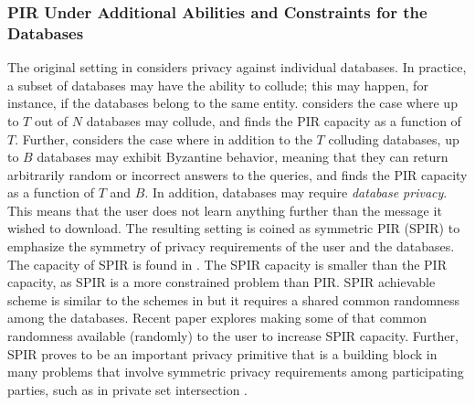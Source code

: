 \subsubsection{PIR Under Additional Abilities and Constraints for the Databases}
The original setting in \cite{sun2017PIRcapacity} considers privacy against individual databases. In practice, a subset of databases may have the ability to collude; this may happen, for instance, if the databases belong to the same entity. \cite{Sun_Jafar_TPIR} considers the case where up to $T$ out of $N$ databases may collude, and finds the PIR capacity as a function of $T$. Further, \cite{BPIRjournal} considers the case where in addition to the $T$ colluding databases, up to $B$ databases may exhibit Byzantine behavior, meaning that they can return arbitrarily random or incorrect answers to the queries, and finds the PIR capacity as a function of $T$ and $B$. In addition, databases may require \emph{database privacy}. This means that the user does not learn anything further than the message it wished to download. The resulting setting is coined as symmetric PIR (SPIR) to emphasize the symmetry of privacy requirements of the user and the databases. The capacity of SPIR is found in  \cite{Sun_Jafar_SPIR}. The SPIR capacity is smaller than the PIR capacity, as SPIR is a more constrained problem than PIR. SPIR achievable scheme is similar to the schemes in \cite{PIRfirst, Shah_Rashmi_Kannan} but it requires a shared common randomness among the databases. Recent paper \cite{SPIR_UserRandomness} explores making some of that common randomness available (randomly) to the user to increase SPIR capacity. Further, SPIR proves to be an important privacy primitive that is a building block in many problems that involve symmetric privacy requirements among participating parties, such as in private set intersection \cite{PSI_journal, MP-PSI_journal}. 

